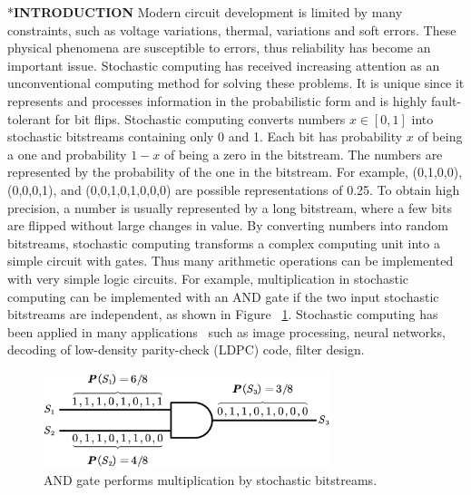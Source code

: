 \documentclass[conference,letterpaper]{IEEEtran}
\makeatletter
\renewcommand{\section}{\@startsection{section}{1}{0mm}
    {-\baselineskip}{0.001\baselineskip}{\bf\leftline}}
\makeatother
\begin{document}
\section*{\textbf{\large INTRODUCTION}}
Modern circuit development is limited by many constraints, such as voltage variations, thermal, variations and soft errors. These physical phenomena are susceptible to errors, thus reliability has become an important issue. Stochastic computing has received increasing attention as an unconventional computing method for solving these problems. It is unique since it represents and processes information in the probabilistic form and is highly fault-tolerant for bit flips. Stochastic computing converts numbers $x\in[0,1]$ into stochastic bitstreams containing only 0 and 1. 
Each bit has probability $x$ of being a one and probability $1-x$ of being a zero in the bitstream. The numbers are represented by the probability of the one  in the bitstream. For example, (0,1,0,0), (0,0,0,1), and (0,0,1,0,1,0,0,0) are possible representations of 0.25. To obtain high precision, a number is usually represented by a long bitstream, where a few bits are flipped without large changes in value. By converting numbers into random bitstreams, stochastic computing transforms a complex computing unit into a simple circuit with gates. Thus many arithmetic operations can be implemented with very simple logic circuits. For example, multiplication in stochastic computing can be implemented with an AND gate if the two input stochastic bitstreams are independent, as shown in Figure ~\ref{fig:sto}.  
Stochastic computing has been applied in many applications~\cite{1} such as image processing, neural networks, decoding of low-density parity-check (LDPC) code, filter design.


\begin{figure}[t]
	\centering
	\includegraphics[width=3.3in]{fig/AND3.pdf}
	\caption{\label{fig:sto}AND gate performs multiplication by stochastic bitstreams.}  \vspace{-3.5ex}
\end{figure}
\end{document}
